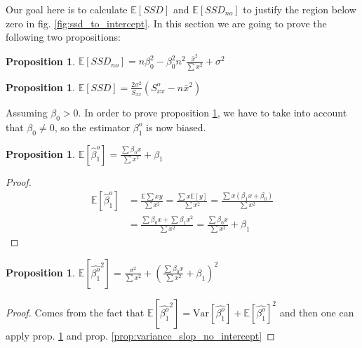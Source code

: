 \documentclass[12pt,a4paper,oneside]{book} %
\newtheorem{proposition}[theorem]{Proposition}
\newcommand{\E}{\mathbb{E}}
\newcommand{\Var}{\mathrm{Var}}
\begin{document}
Our goal here is to calculate $\E [SSD]$ and $\E [SSD_{no}]$ to justify the region below zero in fig. \ref{fig:ssd_to_intercept}. In this section we are going to prove the following two propositions:

\begin{proposition} \label{prop:ssd_no_intercept}
	$\E[SSD_{no}] = n \beta_0^2-\beta_0^2n^2 \frac{\bar{x}^2}{\sum x^2}+ \sigma^2$ 
\end{proposition}

\begin{proposition} \label{prop:ssd_full_model}
	$\E [SSD]= \frac{2\sigma^2}{S_{xx}}(S_{xx}^o-n\bar{x}^2)$
\end{proposition}

Assuming $\beta_0 >0$. In order to prove proposition \ref{prop:ssd_no_intercept}, we have to take into account that $\beta_0 \neq 0$, so the estimator $\beta_1^o$ is now biased.

\begin{proposition} \label{prop:expect_slope_term_biased}
	$	\E [\hat{\beta}_1^o]= \frac{\sum \beta_0 x }{\sum x^2} + \beta_1$ 
\end{proposition}

\begin{proof}

\begin{align*}
	\E [\hat{\beta}_1^o] &=\frac{\E \sum xy}{\sum x^2}
	= \frac{\sum x \E[y]}{\sum x^2} 
	=  \frac{\sum x (\beta_1 x + \beta_0) }{\sum x^2} \\
	&= \frac{\sum \beta_0 x + \sum \beta_1 x^2}{\sum x^2} 
= \frac{\sum \beta_0 x }{\sum x^2} + \beta_1
\end{align*}  

\end{proof}


\begin{proposition} \label{prop:expect_slope_term_biased_squared}
	$\E [\hat{\beta_1^o} ^2] = \frac{\sigma^2}{\sum x^2} + (\frac{\sum \beta_0 x}{\sum x^2}+ \beta_1)^2$ 
\end{proposition}

\begin{proof}
	Comes from the fact that $\E [\hat{\beta_1^o} ^2] = \Var [\hat{\beta_1^o}] + \E [\hat{\beta_1^o}]^2 $ and then one can apply prop. \ref{prop:expect_slope_term_biased} and prop. \ref{prop:variance_slop_no_intercept}
\end{proof}
\end{document}
